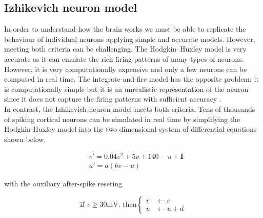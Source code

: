 \documentclass[10pt]{article}
\begin{document}
\subsection{Izhikevich neuron model}

In order to understand how the brain works we must be able to replicate the behaviour of individual neurons applying simple and accurate models. However, meeting both criteria can be challenging. The Hodgkin–Huxley model \cite{hodgkin1952quantitative} is very accurate as it can emulate the rich firing patterns of many types of neurons. However, it is very computationally expensive and only a few neurons can be computed in real time. The integrate-and-fire model \cite{burkitt2006review}  has the opposite problem: it is computationally simple but it is an unrealistic representation of the neuron since it does not capture the firing patterns with sufficient accuracy \cite{izhikevich2003simple}.
\\
In contrast, the Izhikevich neuron model \cite{izhikevich2003simple} meets both criteria. Tens of thousands of spiking cortical neurons can be simulated in real time by simplifying the Hodgkin-Huxley model into the two dimensional system of differential equations shown below.


\begin{align}\label{eq:izhikevich_ode}
&v'=0.04v^{2}+5v+140-u+\textbf{I} \\
&u'=a(bv-u)
\end{align}

with the auxiliary after-spike reseting

\begin{equation}\label{eq:izhikevich_reset}
\text{if } v \geq 30 \text{mV, then}
\begin{cases}
    v     & \leftarrow c \\
    u     & \leftarrow u + d 
  \end{cases}
\end{equation}
\end{document}

